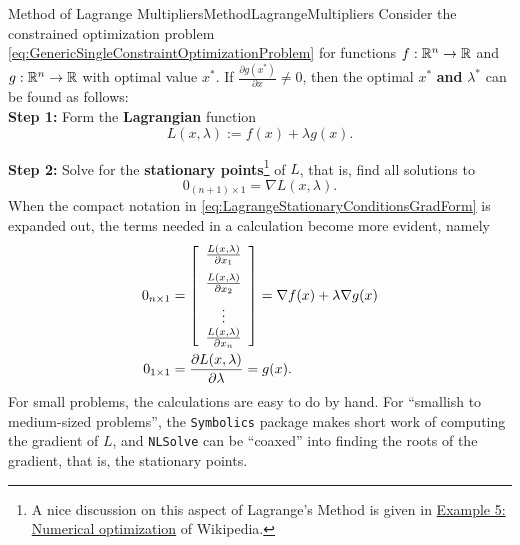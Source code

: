 \begin{methodColor}{Method of Lagrange Multipliers}{MethodLagrangeMultipliers} Consider the constrained optimization problem \eqref{eq:GenericSingleConstraintOptimizationProblem} for functions $f:\mathbb R^n \to \mathbb R$ and $g:\mathbb R^n \to \mathbb R$ with optimal value $x^\ast$. If $\frac{ \partial g(x^\ast)}{\partial x} \neq 0$, then the optimal $x^\ast$ \textbf{and} $\lambda^\ast$ can be found as follows: \\

\textbf{Step 1:} Form the \textbf{Lagrangian} function
\begin{equation}
    L(x, \lambda):= f(x) + \lambda g(x).
\end{equation}

\bigskip

\textbf{Step 2:} Solve for the \textbf{stationary points}\footnote{A nice discussion on this aspect of Lagrange's Method is given in \href{https://tinyurl.com/bde7vtbp}{Example 5: Numerical optimization} of Wikipedia.} of $L$, that is, find all solutions to
\begin{equation}
\label{eq:LagrangeStationaryConditionsGradForm}
0_{(n+1)\times 1} = \nabla L(x, \lambda).
\end{equation}
When the compact notation in \eqref{eq:LagrangeStationaryConditionsGradForm} is expanded out,  the terms needed in a calculation become more evident, namely
\begin{equation}
\label{eq:LagrangeStationaryConditions}
\begin{aligned}
     0_{n \times 1} & = \left[ \begin{array}{c}
         \frac{L(x, \lambda)}{\partial x_1} \medskip \\
          \frac{L(x, \lambda)}{\partial x_2} \medskip \\
          \vdots \\
           \frac{L(x, \lambda)}{\partial x_n}
    \end{array}\right]
 = \nabla f(x) + \lambda \nabla g(x) \medskip \\
     0_{1 \times 1} & = \frac{ \partial L(x, \lambda)}{\partial \lambda} = g(x).
\end{aligned}
\end{equation}
For small problems, the calculations are easy to do by hand. For ``smallish to medium-sized problems'', the \texttt{Symbolics} package makes short work of computing the gradient of $L$, and \texttt{NLSolve} can be ``coaxed'' into finding the roots of the gradient, that is, the stationary points.\\


\end{methodColor}
